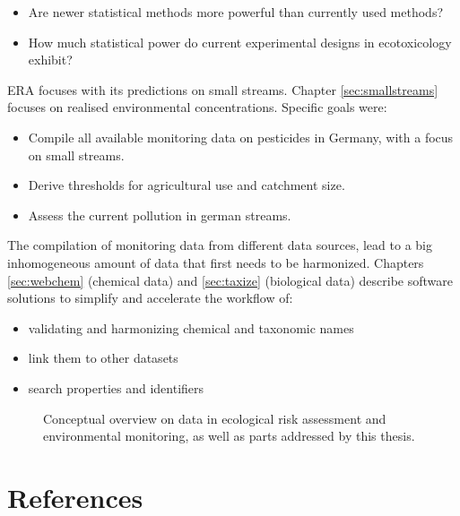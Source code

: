 \begin{itemize}
	\item Are newer statistical methods more powerful than currently used methods?
	\item How much statistical power do current experimental designs in ecotoxicology exhibit?
\end{itemize}

\noindent
ERA focuses with its predictions on small streams. Chapter \ref{sec:smallstreams} focuses on realised environmental concentrations.
Specific goals were:
\begin{itemize}
	\item Compile all available monitoring data on pesticides in Germany, with a focus on small streams.
	\item Derive thresholds for agricultural use and catchment size.
	\item Assess the current pollution in german streams.
\end{itemize}

\noindent
The compilation of monitoring data from different data sources, lead to a big inhomogeneous amount of data that first needs to be harmonized.
Chapters \ref{sec:webchem} (chemical data) and \ref{sec:taxize} (biological data) describe software solutions to simplify and accelerate the workflow of:

\begin{itemize}
	\item validating and harmonizing chemical and taxonomic names
	\item link them to other datasets
	\item search properties and identifiers
\end{itemize}


\begin{figure}[h]
	\centering
	\resizebox{\textwidth}{!}{%
		
	}
	\caption[Conceptual overview of the topics addressed by this thesis]{Conceptual overview on data in ecological risk assessment and environmental monitoring, as well as parts addressed by this thesis.}
	\label{fig:intro:overview}
\end{figure}




\section{References}
\printbibliography[heading=none]
